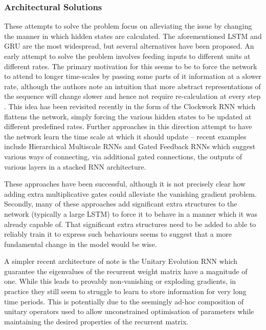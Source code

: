 \subsubsection{Architectural Solutions}
These attempts to solve the problem focus on alleviating the issue by changing the manner in which
hidden states are calculated. The aforementioned LSTM and GRU are the most widespread, but
several alternatives have been proposed. 
An early attempt to solve the problem involves feeding inputs to different units at different
rates. The primary motivation for this seems to be to force the network to attend to longer
time-scales by passing some parts of it information at a slower rate, although the authors note an
intuition that more abstract representations of the sequence will change slower and hence not
require re-calculation at every step \autocite{Hihi1995}. This idea has been revisited recently in
the form of the Clockwork RNN \autocite{Koutnik2014} which flattens the network, simply forcing
the various hidden states to be updated at different predefined rates. Further approaches in this
direction attempt to have the network learn the time scale at which it should update -- recent
examples include Hierarchical Multiscale RNNs \autocite{Chung2016} and Gated Feedback RNNs
\autocite{Chung2015} which suggest various ways of connecting, via additional gated connections,
the outputs of various layers in a stacked RNN architecture.

These approaches have been successful, although it is not precisely clear how adding extra
multiplicative gates could alleviate the vanishing gradient problem. Secondly, many of these
approaches add significant extra structures to the network (typically a large LSTM)
to force it to behave in a manner which
it was already capable of. That significant extra structures need to be added to able to reliably
train it to express such behaviours seems to suggest that a more fundamental change in the model
would be wise.

A simpler recent architecture of note is the Unitary Evolution RNN
\autocite{Arjovsky2015} which guarantee the eigenvalues of the recurrent weight matrix have a
magnitude of one. While this leads to provably non-vanishing or exploding gradients, in
practice they still seem to struggle to learn to store information for very long time periods.
This is potentially due to the seemingly ad-hoc composition of unitary operators used to allow
unconstrained optimisation of parameters while maintaining the desired properties of the
recurrent matrix.

